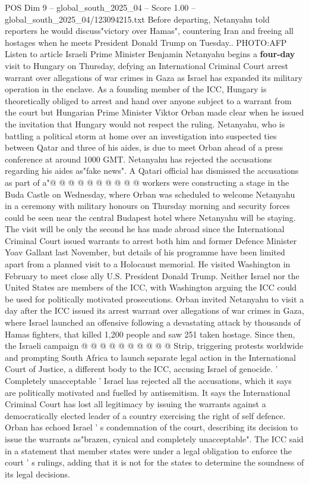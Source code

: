 \begin{textsample}{POS Dim 9 – global\_south\_2025\_04 – Score 1.00 – global\_south\_2025\_04/123094215.txt}  \label{ex:f9_pos_190}
Before departing, Netanyahu told reporters he would discuss"victory over Hamas", countering Iran and freeing all hostages when he meets President Donald Trump on Tuesday..
PHOTO:AFP Listen to article Israeli Prime Minister Benjamin Netanyahu begins a \textbf{four-day} visit to Hungary on Thursday, defying an International Criminal Court arrest warrant over allegations of war crimes in Gaza as Israel has expanded its military operation in the enclave.
As a founding member of the ICC, Hungary is theoretically obliged to arrest and hand over anyone subject to a warrant from the court but Hungarian Prime Minister Viktor Orban made clear when he issued the invitation that Hungary would not respect the ruling.
Netanyahu, who is battling a political storm at home over an investigation into suspected ties between Qatar and three of his aides, is due to meet Orban ahead of a press conference at around 1000 GMT.
Netanyahu has rejected the accusations regarding his aides as"fake news".
A Qatari official has dismissed the accusations as part of a"@ @ @ @ @ @ @ @ @ @ workers were constructing a stage in the Buda Castle on Wednesday, where Orban was scheduled to welcome Netanyahu in a ceremony with military honours on Thursday morning and security forces could be seen near the central Budapest hotel where Netanyahu will be staying.
The visit will be only the second he has made abroad since the International Criminal Court issued warrants to arrest both him and former Defence Minister Yoav Gallant last November, but details of his programme have been limited apart from a planned visit to a Holocaust memorial.
He visited Washington in February to meet close ally U.S.
President Donald Trump.
Neither Israel nor the United States are members of the ICC, with Washington arguing the ICC could be used for politically motivated prosecutions.
Orban invited Netanyahu to visit a day after the ICC issued its arrest warrant over allegations of war crimes in Gaza, where Israel launched an offensive following a devastating attack by thousands of Hamas fighters, that killed 1,200 people and saw 251 taken hostage.
Since then, the Israeli campaign @ @ @ @ @ @ @ @ @ @ Strip, triggering protests worldwide and prompting South Africa to launch separate legal action in the International Court of Justice, a different body to the ICC, accusing Israel of genocide. ' Completely unacceptable ' Israel has rejected all the accusations, which it says are politically motivated and fuelled by antisemitism.
It says the International Criminal Court has lost all legitimacy by issuing the warrants against a democratically elected leader of a country exercising the right of self defence.
Orban has echoed Israel ' s condemnation of the court, describing its decision to issue the warrants as"brazen, cynical and completely unacceptable".
The ICC said in a statement that member states were under a legal obligation to enforce the court ' s rulings, adding that it is not for the states to determine the soundness of its legal decisions.

\end{textsample}
